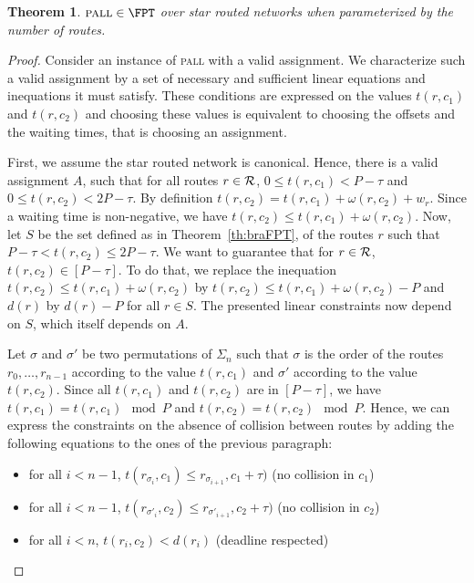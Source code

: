 \documentclass[a4paper,10pt]{journal}
\newtheorem{theorem}{Theorem}
\newcommand\pall{\textsc{pall}\xspace}
\begin{document}
\begin{theorem}\label{th:pallFPT}
$\pall \in \FPT$ over star routed networks when parameterized by the number of routes.
\end{theorem}
\begin{proof}
 Consider an instance of \pall with a valid assignment. We characterize such a valid assignment by a set of necessary and sufficient linear equations and inequations it must satisfy.  These conditions are expressed on the values $t(r,c_1)$ and $t(r,c_2)$ and choosing these values is equivalent to choosing the offsets and the waiting times, that is choosing an assignment.

First, we assume the star routed network is canonical. Hence, there is a valid assignment $A$, such that for all routes $r \in \cal{R}$, $0 \leq t(r,c_1) < P -\tau$ and $0 \leq t(r,c_2) < 2P-\tau$. 
By definition $t(r,c_2) = t(r,c_1) + \omega(r,c_2) + w_r$. Since a waiting time is non-negative, we have $t(r,c_2) \leq t(r,c_1) + \omega(r,c_2)$. 
Now, let $S$ be the set defined as in Theorem~\ref{th:braFPT}, of the routes $r$ such that  $P - \tau < t(r,c_2) \leq 2P - \tau$. We want to guarantee that for $r \in \cal{R}$, $t(r,c_2) \in [P-\tau]$.
To do that, we replace the inequation $t(r,c_2) \leq t(r,c_1) + \omega(r,c_2)$ by $t(r,c_2) \leq t(r,c_1) + \omega(r,c_2) - P$ and $d(r)$ by $d(r) - P$ for all $r \in S$. The presented linear constraints now depend on $S$, which itself depends on $A$.

 Let $\sigma$ and $\sigma'$ be two permutations of $\Sigma_n$ such that $\sigma$ is the order 
 of the routes $r_0,\dots, r_{n-1}$ according to the value $t(r,c_1)$ and $\sigma'$ according to the value $t(r,c_2)$.  Since all $t(r,c_1)$ and $t(r,c_2)$ are in $[P-\tau]$, we have $t(r,c_1) = t(r,c_1) \mod P $ and $t(r,c_2) = t(r,c_2) \mod P $. Hence, we can express the constraints on the absence of collision between routes by adding the following equations to the ones of the previous paragraph:
 
 \begin{itemize}
 	\item for all $i < n-1$, $t(r_{\sigma_{i}},c_1) \leq r_{\sigma_{i+1}},c_1 + \tau)$ (no collision in $c_1$)
 	\item for all $i < n-1$, $t(r_{\sigma'_{i}},c_2) \leq r_{\sigma'_{i+1}},c_2 + \tau)$ (no collision in $c_2$)
 	\item for all $i < n$,  $t(r_{i},c_2) < d(r_i)$ (deadline respected)
 \end{itemize}


\end{proof}
\end{document}
